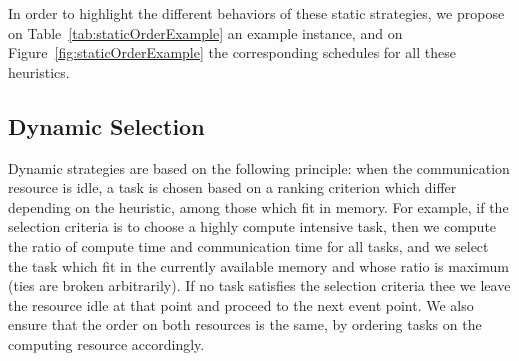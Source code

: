 \documentclass[sigconf]{acmart}
\begin{document}
	In order to highlight the different behaviors of these static strategies, we propose on Table~\ref{tab:staticOrderExample} an example instance, and on Figure~\ref{fig:staticOrderExample} the corresponding schedules for all these heuristics.
	
	
	\subsection{Dynamic Selection}
	
	Dynamic strategies are based on the following principle: when the communication resource is idle, a task is chosen based on a ranking criterion which differ depending on the heuristic, among those which fit in memory. For example, if the selection criteria is to choose a highly compute intensive task, then we compute the ratio of compute time and communication time for all tasks, and we select the task which fit in the currently available memory and whose ratio is maximum (ties are broken arbitrarily). If no task satisfies the selection criteria thee we leave the resource idle at that point and proceed to the next event point. We also ensure that the order on both resources is the same, by ordering tasks on the computing resource accordingly.
	
	
\end{document}
